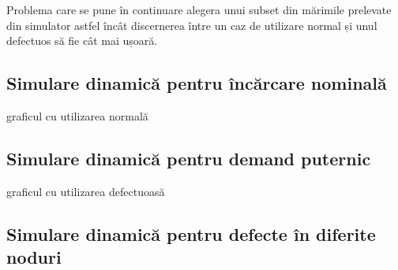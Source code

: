 Problema care se pune în continuare alegera unui subset din mărimile prelevate din simulator astfel încât discernerea între un caz de utilizare normal și unul defectuos să fie cât mai ușoară. 


\subsection{Simulare dinamică pentru încărcare nominală}
graficul cu utilizarea normală
\subsection{Simulare dinamică pentru demand puternic}
graficul cu utilizarea defectuoasă
\subsection{Simulare dinamică pentru defecte în diferite noduri}
